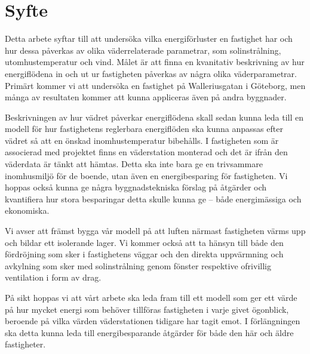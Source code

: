 \section{Syfte}
Detta arbete syftar till att undersöka vilka energiförluster en fastighet har och hur dessa påverkas av olika väderrelaterade parametrar, som solinstrålning, utomhustemperatur och vind. Målet är att finna en kvanitativ beskrivning av hur energiflödena in och ut ur fastigheten påverkas av några olika väderparametrar. Primärt kommer vi att undersöka en fastighet på Walleriusgatan i Göteborg, men många av resultaten kommer att kunna appliceras även på andra byggnader.

Beskrivningen av hur vädret påverkar energiflödena skall sedan kunna leda till en modell för hur fastighetens reglerbara energiflöden ska kunna anpassas efter vädret så att en önskad inomhustemperatur bibehålls. I fastigheten som är associerad med projektet finns en väderstation monterad och det är ifrån den väderdata är tänkt att hämtas. Detta ska inte bara ge en trivsammare inomhusmiljö för de boende, utan även en energibesparing för fastigheten. Vi hoppas också kunna ge några byggnadstekniska förslag på åtgärder och kvantifiera hur stora besparingar detta skulle kunna ge – både energimässiga och ekonomiska.

Vi avser att främst bygga vår modell på att luften närmast fastigheten värms upp och bildar ett isolerande lager. Vi kommer också att ta hänsyn till både den fördröjning som sker i fastighetens väggar och den direkta uppvärmning och avkylning som sker med solinstrålning genom fönster respektive ofrivillig ventilation i form av drag.

På sikt hoppas vi att vårt arbete ska leda fram till ett modell som ger ett värde på hur mycket energi som behöver tillföras fastigheten i varje givet ögonblick, beroende på vilka värden väderstationen tidigare har tagit emot. I förlängningen ska detta kunna leda till energibesparande åtgärder för både den här och äldre fastigheter.
